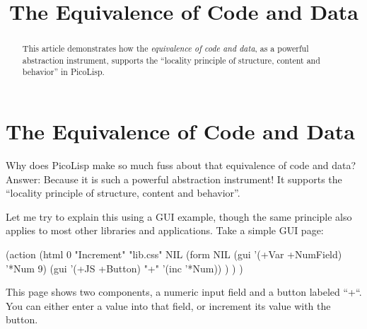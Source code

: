 \title{The Equivalence of Code and Data}

\maketitle





% 

\begin{abstract}
  This article demonstrates how the \emph{equivalence of code and
    data}, as a powerful abstraction instrument, supports the
  ``locality principle of structure, content and behavior'' in PicoLisp.
\end{abstract}

\section{The Equivalence of Code and Data}
\label{sec:equiv-equivalence-code-data}

Why does PicoLisp make so much fuss about that equivalence of code and data?
Answer: Because it is such a powerful abstraction instrument! It supports the
``locality principle of structure, content and behavior''.

Let me try to explain this using a GUI example, though the same principle also
applies to most other libraries and applications. Take a simple GUI page:
\begin{wideverbatim}
   (action
      (html 0 "Increment" "lib.css" NIL
         (form NIL
            (gui '(+Var +NumField) '*Num 9)
            (gui '(+JS +Button) "+" '(inc '*Num)) ) ) )
\end{wideverbatim}

This page shows two components, a numeric input field and a button labeled ``+``.
You can either enter a value into that field, or increment its value with the
button.

